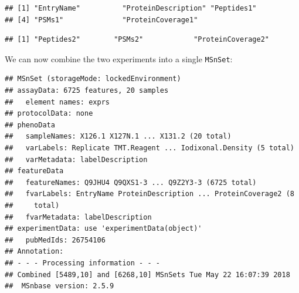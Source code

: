 \begin{knitrout}
\color{fgcolor}\begin{kframe}
\begin{alltt}
\hlstd{(hyperLOPIT2015ms3r1)[}\hlopt{:}\hlstd{]} \hlkwb{<-} \hlstd{(}\hlstd{(hyperLOPIT2015ms3r1)[}\hlopt{:}\hlstd{],} \hlstd{)}
 \hlkwb{<-}  \hlstd{,}  \hlstd{=} \hlstd{)}
 \hlkwb{<-} \hlstd{(hyperLOPIT2015ms3r1)[}\hlopt{:}\hlstd{]}
 \hlkwb{<-} \hlstd{(hyperLOPIT2015ms3r2)[}\hlopt{:}\hlstd{]}
\end{alltt}
\begin{verbatim}
## [1] "EntryName"          "ProteinDescription" "Peptides1"         
## [4] "PSMs1"              "ProteinCoverage1"
\end{verbatim}
\begin{alltt}
\end{alltt}
\begin{verbatim}
## [1] "Peptides2"        "PSMs2"            "ProteinCoverage2"
\end{verbatim}
\end{kframe}
\end{knitrout}

We can now combine the two experiments into a single \texttt{MSnSet}:

\begin{knitrout}
\color{fgcolor}\begin{kframe}
\begin{alltt}
 \hlkwb{<-} 
\end{alltt}
\begin{verbatim}
## MSnSet (storageMode: lockedEnvironment)
## assayData: 6725 features, 20 samples 
##   element names: exprs 
## protocolData: none
## phenoData
##   sampleNames: X126.1 X127N.1 ... X131.2 (20 total)
##   varLabels: Replicate TMT.Reagent ... Iodixonal.Density (5 total)
##   varMetadata: labelDescription
## featureData
##   featureNames: Q9JHU4 Q9QXS1-3 ... Q9Z2Y3-3 (6725 total)
##   fvarLabels: EntryName ProteinDescription ... ProteinCoverage2 (8
##     total)
##   fvarMetadata: labelDescription
## experimentData: use 'experimentData(object)'
##   pubMedIds: 26754106 
## Annotation:  
## - - - Processing information - - -
## Combined [5489,10] and [6268,10] MSnSets Tue May 22 16:07:39 2018 
##  MSnbase version: 2.5.9
\end{verbatim}
\end{kframe}
\end{knitrout}

